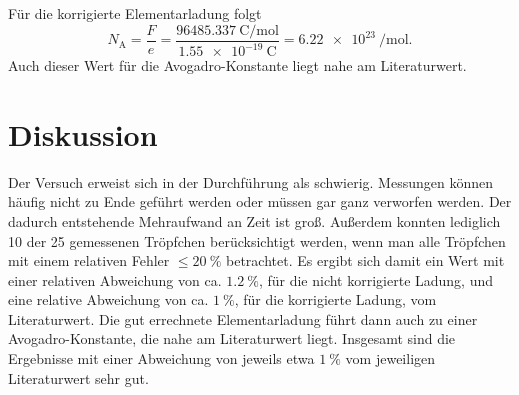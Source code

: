 \documentclass[
  bibliography=totoc,     %
  captions=tableheading,  %
  titlepage=firstiscover, %
]{scrartcl}
\begin{document}
Für die korrigierte Elementarladung folgt
\begin{equation}
    N_{\mathup{A}}=\frac{F}{e}=\frac{\SI{96485.337}{\coulomb\per\mol}}{\SI{1.55e-19}{\coulomb}}=\SI{6.22e23}{\per\mol}.
\end{equation}
Auch dieser Wert für die Avogadro-Konstante liegt nahe am Literaturwert.
\section{Diskussion}
\label{sec:diskussion}

Der Versuch erweist sich in der Durchführung als schwierig. Messungen können häufig nicht zu Ende geführt werden oder müssen gar ganz verworfen werden. Der dadurch entstehende Mehraufwand an Zeit ist groß. Außerdem konnten lediglich 10 der 25 gemessenen Tröpfchen berücksichtigt werden, wenn man alle Tröpfchen mit einem relativen Fehler $\leq\SI{20}{\percent}$ betrachtet. Es ergibt sich damit ein Wert mit einer relativen Abweichung von ca. $\SI{1.2}{\percent}$, für die nicht korrigierte Ladung, und eine relative Abweichung von ca. $\SI{1}{\percent}$, für die korrigierte Ladung, vom Literaturwert. Die gut errechnete Elementarladung führt dann auch zu einer Avogadro-Konstante, die nahe am Literaturwert liegt. Insgesamt sind die Ergebnisse mit einer Abweichung von jeweils etwa $\SI{1}{\percent}$ vom jeweiligen Literaturwert sehr gut.

\nocite{*}
\printbibliography
\end{document}
